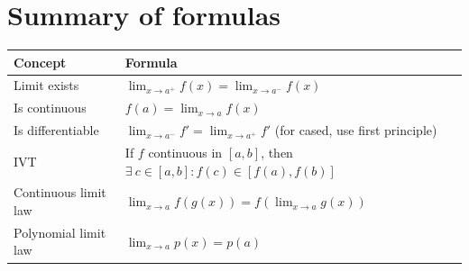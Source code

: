 \documentclass{article}
\begin{document}
\section{Summary of formulas}
\small
\begin{tabular}{|l|l|}
    \hline
    \textbf{Concept}                    & \textbf{Formula}                                                                                                                                                                                                                                                                                     \\\hline
    Limit exists                        & $\lim_{x\to a^+}f(x)=\lim_{x\to a^-}f(x)$                                                                                                                                                                                                                                                            \\
    Is continuous                       & $f(a)=\lim_{x\to a}f(x)$                                                                                                                                                                                                                                                                             \\
    Is differentiable                   & $\lim_{x\to a^-}f' = \lim_{x\to a^+}f'$ (for cased, use first principle)                                                                                                                                                                                                                             \\
    IVT                                 & If $f$ continuous in $[a,b]$, then $\exists\ c\in[a,b]:f(c)\in[f(a),f(b)]$                                                                                                                                                                                                                           \\
    Continuous limit law                & $\lim_{x\to a}f(g(x)) = f(\lim_{x\to a}g(x))$                                                                                                                                                                                                                                                        \\
    Polynomial limit law                & $\lim_{x\to a}p(x) = p(a)$                                                                                                                                                                                                                                                                           \\

\end{tabular}
\end{document}
